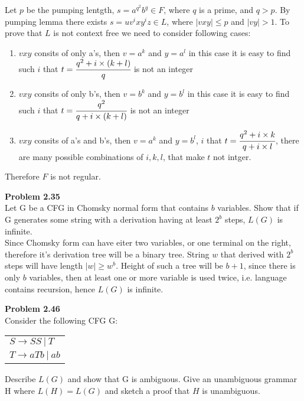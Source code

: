 \documentclass{article}
\newcommand{\problem}[1]{\large{\textbf{Problem #1} \\}}
\begin{document}
Let $p$ be the pumping lentgth, $s = a^{q^2} b^q \in F$, where $q$ is a prime, and $q > p$. By pumping lemma 
there exists $s = uv^ixy^iz \in L$, where $|vxy| \leq p$ and $|vy| > 1$. To prove
that $L$ is not context free we need to consider following cases:

\begin{enumerate}[\underline{Case} 1., leftmargin = 1.5cm]
\itemsep0em
\item $vxy$ consits of only a's, then $v = a^k$ and $y = a^l$ in this case it is easy 
    to find such $i$ that $t = \cfrac{q^2 + i\times(k+l)}{q}$ is not an integer
\item $vxy$ consits of only b's, then $v = b^k$ and $y =b^l$ in this case it is easy 
    to find such $i$ that $t = \cfrac{q^2}{q + i\times(k+l)}$ is not an integer
\item $vxy$ consits of a's and b's, then $v = a^k$ and $y =b^l$, $i$ that $t = \cfrac{q^2 +i\times k}{q + i\times l}$,
    there are many possible combinations of $i,k,l$, that make $t$ not intger.
\end{enumerate}

Therefore $F$ is not regular.

\vspace{0.4cm}
\problem{2.35}
Let G be a CFG in Chomsky normal form that contains $b$ variables. Show that if G generates some string with a derivation having 
at least $2^b$ steps, $L(G)$ is infinite. \\

Since Chomsky form can have eiter two variables, or one terminal on the right, therefore it's derivation tree
will be a binary tree. String $w$ that derived with $2^b$ steps will have length $|w| \geq w^b$. Height of such a tree
will be $b + 1$, since there is only $b$ variables, then at least one or more variable is used twice, i.e. language 
contains recursion, hence $L(G)$ is infinite.

\vspace{0.4cm}
\problem{2.46}
Consider the following CFG G:
\begin{table}[h!]
\centering
\begin{tabular}{l}
$S \rightarrow SS \:| \:T$ \\
$T \rightarrow aTb \:| \:ab$
\end{tabular}
\end{table}
Describe $L(G)$ and show that G is ambiguous. Give an unambiguous grammar H where $L(H) = L(G)$ and
sketch a proof that $H$ is unambiguous. \\
\end{document}
